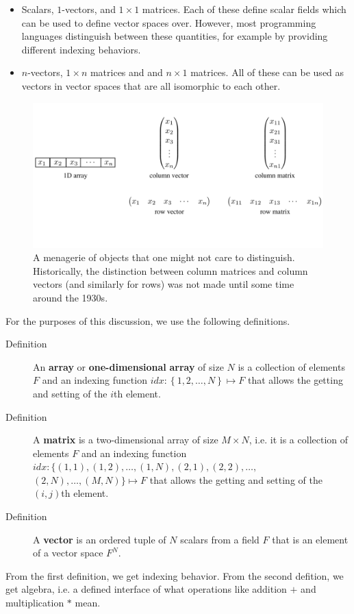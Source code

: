 \begin{itemize}
\item
Scalars, $1$-vectors, and $1\times1$ matrices. Each of these define scalar fields which can be used to define vector spaces over. However, most programming languages distinguish between these quantities, for example by providing different indexing behaviors.

\item
$n$-vectors, $1\times n$ matrices and and $n\times1$ matrices. All of these can be used as vectors in vector spaces that are all isomorphic to each other.

\end{itemize}

\begin{figure}
\caption{A menagerie of objects that one might not care to distinguish. Historically,
the distinction between column matrices and column vectors (and similarly
for rows) was not made until some time around the 1930s.}

\begin{centering}
\includegraphics[width=0.95\columnwidth]{figures/fig-zoo}
\par\end{centering}
\end{figure}

For the purposes of this discussion, we use the following definitions.
\begin{description}
\item [{Definition}] An \textbf{array} or \textbf{one-dimensional} \textbf{array}
of size $N$ is a collection of elements $F$ and an indexing function
$idx:\left\{ 1,2,\dots,N\right\} \mapsto F$ that allows the getting
and setting of the $i$th element.
\item [{Definition}] A \textbf{matrix} is a two-dimensional array of size
$M\times N$, i.e. it is a collection of elements $F$ and an indexing
function $idx:\{\left(1,1\right),\left(1,2\right),\dots,\left(1,N\right),\left(2,1\right),\left(2,2\right),\dots,$
$\left(2,N\right),\dots,\left(M,N\right)\}\mapsto F$ that allows
the getting and setting of the $\left(i,j\right)$th element.
\item [{Definition}] A \textbf{vector} is an ordered tuple of $N$ scalars
from a field $F$ that is an element of a vector space $F^{N}$.
\end{description}
From the first definition, we get indexing behavior. From the second
defition, we get algebra, i.e. a defined interface of what operations
like addition $+$ and multiplication $*$ mean.

